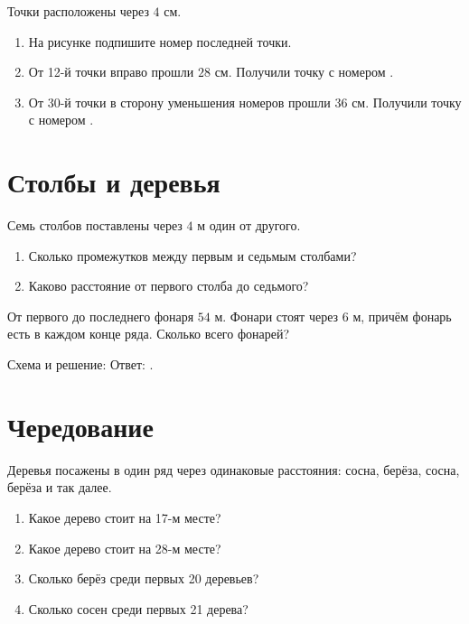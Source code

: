 \unknownpointfigure

\begin{practicebox}
  Точки расположены через \(4\) см.
  \begin{enumerate}[label=\alph*),itemsep=0.65em]
    \item На рисунке подпишите номер последней точки.
    \item От 12-й точки вправо прошли \(28\) см. Получили точку с номером
      \answerblank[22mm].
    \item От 30-й точки в сторону уменьшения номеров прошли \(36\) см.
      Получили точку с номером \answerblank[22mm].
  \end{enumerate}
\end{practicebox}

\section{Столбы и деревья}

\postrowfigure

\begin{practicebox}
  Семь столбов поставлены через \(4\) м один от другого.
  \begin{enumerate}[label=\alph*),itemsep=0.55em]
    \item Сколько промежутков между первым и седьмым столбами?
      \answerblank[22mm]
    \item Каково расстояние от первого столба до седьмого?
      \answerblank[45mm]
  \end{enumerate}
\end{practicebox}

\clearpage
\begin{thinkbox}
  От первого до последнего фонаря \(54\) м. Фонари стоят через \(6\) м,
  причём фонарь есть в каждом конце ряда. Сколько всего фонарей?

  Схема и решение:
  \studentworkline
  Ответ: \answerblank[35mm].
\end{thinkbox}

\section{Чередование}

\alternatingtreesfigure

\begin{practicebox}
  Деревья посажены в один ряд через одинаковые расстояния: сосна, берёза,
  сосна, берёза и так далее.
  \begin{enumerate}[label=\alph*),itemsep=0.65em]
    \item Какое дерево стоит на 17-м месте? \answerblank[32mm]
    \item Какое дерево стоит на 28-м месте? \answerblank[32mm]
    \item Сколько берёз среди первых 20 деревьев? \answerblank[24mm]
    \item Сколько сосен среди первых 21 дерева? \answerblank[24mm]
  \end{enumerate}
\end{practicebox}


